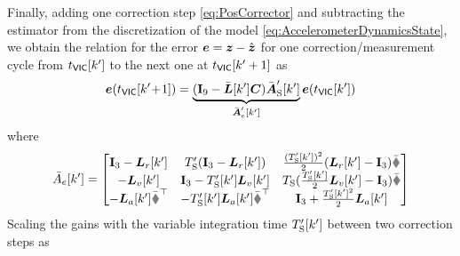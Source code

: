 Finally, adding one correction step \eqref{eq:PosCorrector} and subtracting the estimator from the discretization of the model \eqref{eq:AccelerometerDynamicsState}, we obtain the relation for the error $\tuple{e} = \tuple{z} - \hat{\tuple{z}}$ for one correction/measurement cycle from $\tVIC[k']$ to the next one at $\tVIC[k'+1]$ as
\begin{align}
 \tuple{e}(\tVIC[k'\!+\!1]) = \underbrace{(\idMat[9] - \bar{\mat{L}}[k'] \mat{C}) \bar{\mat{A}}'_\idxSamp[k']}_{\bar{\mat{A}}'_e[k']} \tuple{e}(\tVIC[k'])
\end{align}
where
\begin{align}
 \bar{A}_e[k'] = 
 \begin{bmatrix} 
  \idMat[3] - \mat{L}_r[k'] & \Tsp(\idMat[3] - \mat{L}_r[k']) & \tfrac{(\Tsp[k'])^2}{2}(\mat{L}_r[k'] - \idMat[3]) \bar{\R} \\
  -\mat{L}_v[k'] & \idMat[3] - \Tsp[k'] \mat{L}_v[k'] & \Ts(\tfrac{\Tsp[k']}{2} \mat{L}_v[k'] - \idMat[3])\bar{\R} \\
  -\mat{L}_a[k'] \bar{\R}^\top & -\Tsp[k'] \mat{L}_a[k'] \bar{\R}^\top & \idMat[3] + \tfrac{\Tsp[k']^2}{2} \mat{L}_a[k']
 \end{bmatrix}
\end{align}
Scaling the gains with the variable integration time $\Tsp[k']$ between two correction steps as
